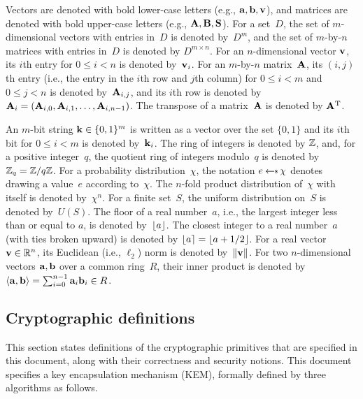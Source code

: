 \documentclass{iacrcc}
\begin{document}
Vectors are denoted with bold lower-case letters (e.g., $\mathbf{a}, \mathbf{b}, \mathbf{v}$),
and matrices are denoted with bold upper-case letters (e.g., $\mathbf{A}, \mathbf{B}, \mathbf{S}$).
For a set~$D$, the set of $m$-dimensional vectors with entries in~$D$ is denoted by~$D^{m}$,
and the set of $m$-by-$n$ matrices with entries in~$D$ is denoted by $D^{m \times n}$.
For an $n$-dimensional vector $\mathbf{v}$, its $i$th entry for $0\leq i < n$ is denoted by~$\mathbf{v}_i$.
For an $m$-by-$n$ matrix~$\mathbf{A}$, its $(i,j)$th entry (i.e., the entry in the $i$th row and $j$th
column) for $0 \leq i <m$ and $0 \leq j < n$ is denoted by~$\mathbf{A}_{i,j}$, and its $i$th row is
denoted by~$\mathbf{A}_i = (\mathbf{A}_{i,0},\mathbf{A}_{i,1},\ldots,\mathbf{A}_{i,n-1})$.
The transpose of a matrix~$\mathbf{A}$ is denoted by $\mathbf{A}^\text{T}$.  

An $m$-bit string $\mathbf{k}\in \{0,1\}^m$ is written as a vector over the set $\{0,1\}$ and
its $i$th bit for $0 \leq i < m$ is denoted by~$\mathbf{k}_i$. 
The ring of integers is denoted by $\mathbb{Z}$, and, for a positive integer~$q$, the quotient ring
of integers modulo~$q$ is denoted by $\mathbb{Z}_q = \mathbb{Z}/q\mathbb{Z}$.
For a probability distribution~$\chi$, the notation $e \getsr \chi$ denotes drawing a value~$e$
according to~$\chi$.
The $n$-fold product distribution of~$\chi$ with itself is denoted by~$\chi^{n}$.
For a finite set~$S$, the uniform distribution on~$S$ is denoted by~$U(S)$.
The floor of a real number~$a$, i.e., the largest integer less than or equal to $a$,
is denoted by~$\lfloor a\rfloor$.
The closest integer to a real number~$a$ (with ties broken upward) is denoted by
$\lfloor a\rceil = \lfloor a+1/2\rfloor$.
For a real vector $\mathbf{v}\in \mathbb{R}^n$, its Euclidean (i.e., $\ell_{2}$) norm is denoted
by~$\lVert\mathbf{v}\rVert$.
For two $n$-dimensional vectors $\mathbf{a}, \mathbf{b}$ over a common ring~$R$, their inner product
is denoted by $\langle\mathbf{a}, \mathbf{b}\rangle = \sum_{i=0}^{n-1} \mathbf{a}_{i} \mathbf{b}_{i} \in R$.

\fi

\subsection{Cryptographic definitions}
\label{sec:background:crypto}

This section states definitions of the cryptographic primitives that are specified in this document, along with their correctness and security notions.
This document specifies a key encapsulation mechanism (KEM), formally defined by three algorithms as follows.
\end{document}
